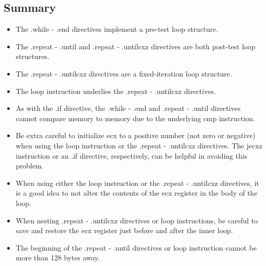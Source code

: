 \documentclass[10pt]{book}
\begin{document}
\subsection{Summary}
\begin{itemize}
  \item The .while - .end directives implement a pre-test loop structure.
  \item The .repeat - .until and .repeat - .untilcxz directives are both post-test loop structures.
  \item The .repeat - .untilcxz directives are a fixed-iteration loop structure.
  \item The loop instruction underlies the .repeat - .untilcxz directives.
  \item As with the .if directive, the .while - .end and .repeat - .until directives cannot compare memory to memory due to the underlying cmp instruction.
  \item Be extra careful to initialize ecx to a positive number (not zero or negative) when using the loop instruction or the .repeat - .untilcxz directives. The jecxz instruction or an .if directive, respectively, can be helpful in avoiding this problem.
  \item When using either the loop instruction or the .repeat - .untilcxz directives, it is a good idea to not alter the contents of the ecx register in the body of the loop.
  \item When nesting .repeat - .untilcxz directives or loop instructions, be careful to save and restore the ecx register just before and after the inner loop.
  \item The beginning of the .repeat - .until directives or loop instruction cannot be more than 128 bytes away.
\end{itemize}
\end{document}
